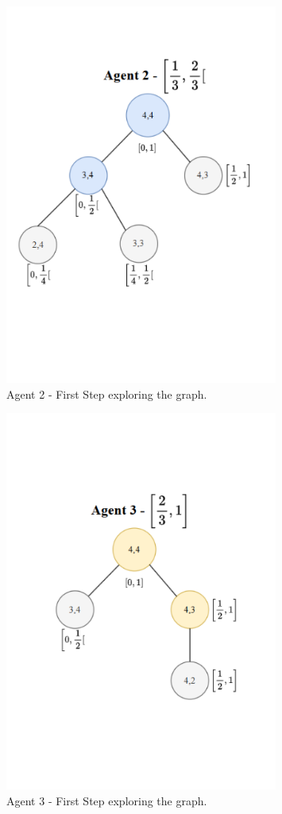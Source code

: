 \begin{figure}[H]
    \centering
    \includegraphics[width=0.8\textwidth]{ApeA/maze_agent_2_step_1.png}
    \caption{Agent 2 - First Step exploring the graph.}
    \label{fig_agent_2_step_1}
\end{figure}

\begin{figure}[H]
    \centering
    \includegraphics[width=0.8\textwidth]{ApeA/maze_agent_3_step_1.png}
    \caption{Agent 3 - First Step exploring the graph.}
    \label{fig_agent_3_step_1}
\end{figure}

